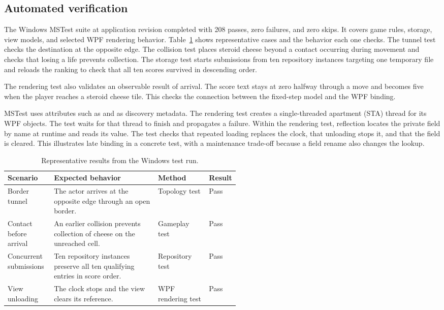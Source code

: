\subsection{Automated verification}

The Windows MSTest suite at application revision  completed with 208 passes, zero failures, and zero skips. It covers game rules, storage, view models, and selected WPF rendering behavior. Table~\ref{tab:verification} shows representative cases and the behavior each one checks. The tunnel test checks the destination at the opposite edge. The collision test places steroid cheese beyond a contact occurring during movement and checks that losing a life prevents collection. The storage test starts submissions from ten repository instances targeting one temporary file and reloads the ranking to check that all ten scores survived in descending order.

The rendering test also validates an observable result of arrival. The score text stays at zero halfway through a move and becomes five when the player reaches a steroid cheese tile. This checks the connection between the fixed-step model and the WPF binding.

MSTest uses attributes such as \code{[TestClass]} and \code{[TestMethod]} as discovery metadata. The rendering test creates a single-threaded apartment (STA) thread for its WPF objects. The test waits for that thread to finish and propagates a failure. Within the rendering test, reflection locates the private  field by name at runtime and reads its value. The test checks that repeated loading replaces the clock, that unloading stops it, and that the field is cleared. This illustrates late binding in a concrete test, with a maintenance trade-off because a field rename also changes the lookup.

\begin{table}[h!]
  \centering
  \caption{Representative results from the Windows test run.}
  \label{tab:verification}
  \small
  \renewcommand{\arraystretch}{1.18}
  \begin{tabularx}{\linewidth}{@{}>{\raggedright\arraybackslash}p{0.20\linewidth}
    >{\raggedright\arraybackslash}X
    >{\raggedright\arraybackslash}p{0.22\linewidth}
    >{\raggedright\arraybackslash}p{0.11\linewidth}@{}}
    \toprule
    Scenario & Expected behavior & Method & Result \\
    \midrule
    Border tunnel & The actor arrives at the opposite edge through an open border. & Topology test & Pass \\
    Contact before arrival & An earlier collision prevents collection of cheese on the unreached cell. & Gameplay test & Pass \\
    Concurrent submissions & Ten repository instances preserve all ten qualifying entries in score order. & Repository test & Pass \\
    View unloading & The clock stops and the view clears its reference. & WPF rendering test & Pass \\
    \bottomrule
  \end{tabularx}
\end{table}

